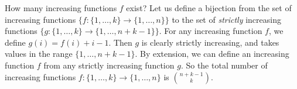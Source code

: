 How many increasing functions \(f\) exist? Let us define a bijection from the set of increasing functions \(\{f\colon \{1, \dots, k\} \to \{1, \dots, n\}\}\) to the set of \textit{strictly} increasing functions \(\{g\colon \{1, \dots, k\} \to \{1, \dots, n+k-1\}\}\).
For any increasing function \(f\), we define \(g(i) = f(i) + i - 1\).
Then \(g\) is clearly strictly increasing, and takes values in the range \(\{1, \dots, n+k-1\}\).
By extension, we can define an increasing function \(f\) from any strictly increasing function \(g\).
So the total number of increasing functions \(f\colon \{1, \dots, k\} \to \{1, \dots, n\}\) is \(\binom{n+k-1}{k}\).
